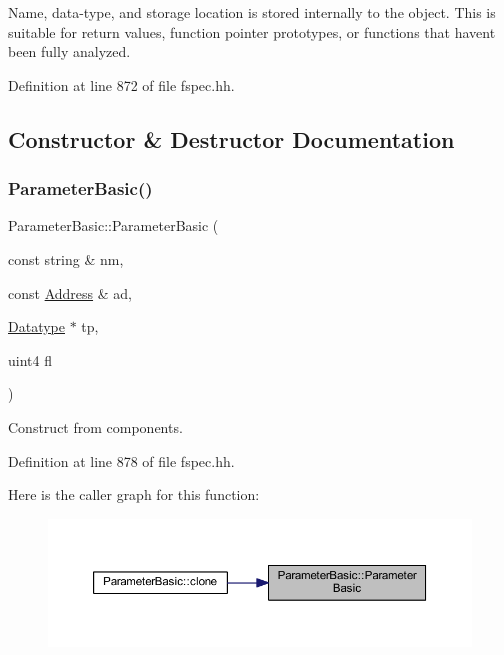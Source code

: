 Name, data-\/type, and storage location is stored internally to the object. This is suitable for return values, function pointer prototypes, or functions that haven\textquotesingle{}t been fully analyzed. 

Definition at line 872 of file fspec.\+hh.



\subsection{Constructor \& Destructor Documentation}
\mbox{\label{class_parameter_basic_a2b84d49e6b4eca382a863567de942193}} 
\subsubsection{\texorpdfstring{ParameterBasic()}{ParameterBasic()}}
{\footnotesize\ttfamily Parameter\+Basic\+::\+Parameter\+Basic (\begin{DoxyParamCaption}\item[{const string \&}]{nm,  }\item[{const \mbox{\hyperlink{class_address}{Address}} \&}]{ad,  }\item[{\mbox{\hyperlink{class_datatype}{Datatype}} $\ast$}]{tp,  }\item[{uint4}]{fl }\end{DoxyParamCaption})\hspace{0.3cm}{\ttfamily [inline]}}



Construct from components. 



Definition at line 878 of file fspec.\+hh.

Here is the caller graph for this function\+:
\nopagebreak
\begin{figure}[H]
\begin{center}
\leavevmode
\includegraphics[width=350pt]{class_parameter_basic_a2b84d49e6b4eca382a863567de942193_icgraph}
\end{center}
\end{figure}


